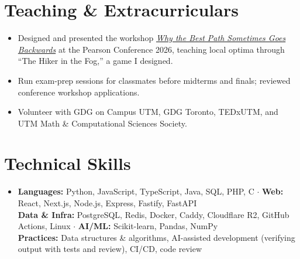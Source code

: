 \documentclass[letterpaper,10pt]{article}
\newcommand{\resumeItem}[1]{
\item\normalsize{#1 \vspace{-3pt}}
}
\newcommand{\resumeItemListStart}{
\begin{itemize}[leftmargin=0.15in, itemsep=0pt, topsep=2pt, label=\textbullet]
}
\newcommand{\resumeItemListEnd}{
\end{itemize}\vspace{2pt}
}
\begin{document}
\section{Teaching \& Extracurriculars}
\resumeItemListStart
\resumeItem{Designed and presented the workshop \href{https://renfred.dev/pearson2026}{\textit{Why the Best Path Sometimes Goes Backwards}} at the Pearson Conference
2026, teaching local optima through ``The Hiker in the Fog,'' a game I designed.}
\resumeItem{Run exam-prep sessions for classmates before midterms and finals; reviewed conference workshop applications.}
\resumeItem{Volunteer with GDG on Campus UTM, GDG Toronto, TEDxUTM, and UTM Math \& Computational Sciences Society.}
\resumeItemListEnd

\section{Technical Skills}
\begin{itemize}[leftmargin=0.15in, label={}, topsep=2pt]
\small
\item{
\textbf{Languages:} Python, JavaScript, TypeScript, Java, SQL, PHP, C $\cdot$ \textbf{Web:} React, Next.js, Node.js, Express, Fastify, FastAPI \\
\textbf{Data \& Infra:} PostgreSQL, Redis, Docker, Caddy, Cloudflare R2, GitHub Actions, Linux $\cdot$ \textbf{AI/ML:} Scikit-learn, Pandas, NumPy \\
\textbf{Practices:} Data structures \& algorithms, AI-assisted development (verifying output with tests and review), CI/CD, code review
}
\end{itemize}
\end{document}
